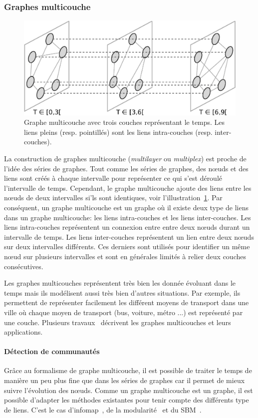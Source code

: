 \subsubsection{Graphes multicouche}
\begin{figure}[h]
\centering
\includegraphics[width=0.7\linewidth]{img/Intro/multiplex.eps}
\caption{Graphe multicouche avec trois couches représentant le temps.
Les liens pleins (resp. pointillés) sont les liens intra-couches (resp. inter-couches).}
\label{fig:exemple_multiplex}
\end{figure}
La construction de graphes multicouche (\emph{multilayer} ou \emph{multiplex}) est proche de l'idée des séries de graphes.
Tout comme les séries de graphes, des n\oe uds et des liens sont créés à chaque intervalle pour représenter ce qui s'est déroulé l'intervalle de temps.
Cependant, le graphe multicouche ajoute des liens entre les n\oe uds de deux intervalles si'ls sont identiques, voir l'illustration~\ref{fig:exemple_multiplex}.
Par conséquent, un graphe multicouche est un graphe où il existe deux type de liens dans un graphe multicouche: les liens intra-couches et les liens inter-couches.
Les liens intra-couches représentent un connexion entre entre deux n\oe uds durant un intervalle de temps.
Les liens inter-couches représentent un lien entre deux n\oe uds sur deux intervalles différents.
Ces derniers sont utilisés pour identifier un même n\oe ud sur plusieurs intervalles et sont en générales limités à relier deux couches consécutives.

Les graphes multicouches représentent très bien les donnée évoluant dans le temps mais ils modélisent aussi très bien d'autres situations.
Par exemple, ils permettent de représenter facilement les différent moyens de transport dans une ville où chaque moyen de transport (bus, voiture, métro ...) est représenté par une couche.
Plusieurs travaux~\cite{DeDomenico2013,Kivela2014,Boccaletti2014} décrivent les graphes multicouches et leurs applications.



\paragraph{Détection de communautés}
Grâce au formalisme de graphe multicouche, il est possible de traiter le temps de manière un peu plus fine que dans les séries de graphes car il permet de mieux suivre l'évolution des n\oe uds.
Comme un graphe multicouche est un graphe, il est possible d'adapter les méthodes existantes pour tenir compte des différents type de liens.
C'est le cas d'infomap~\cite{DeDomenico2014}, de la modularité~\cite{Mucha2010,Bassett2013,Bazzi2016} et du SBM~\cite{Stanley2015,Peixoto2015c}.


